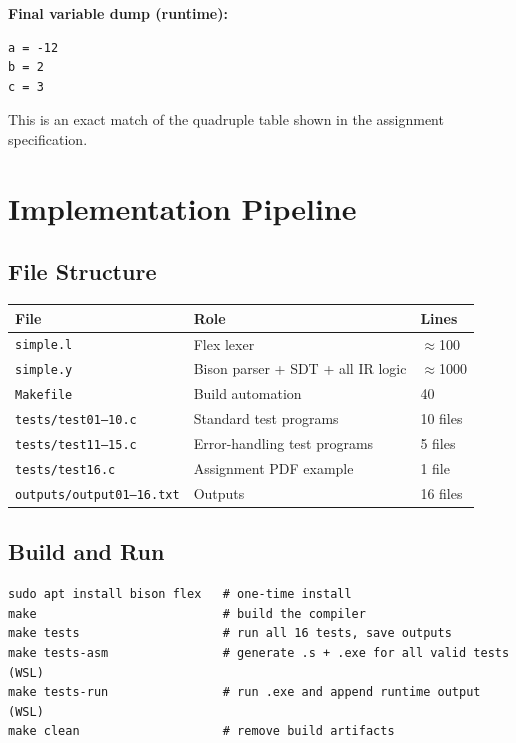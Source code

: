 \documentclass[11pt]{article}
\begin{document}
\textbf{Final variable dump (runtime):}
\begin{lstlisting}[style=outputstyle]
a = -12
b = 2
c = 3
\end{lstlisting}

This is an exact match of the quadruple table shown in the assignment specification.

\section{Implementation Pipeline}

\subsection{File Structure}

\begin{center}
\renewcommand{\arraystretch}{1.3}
\begin{tabular}{@{}lll@{}}
\toprule
\textbf{File} & \textbf{Role} & \textbf{Lines} \\
\midrule
\texttt{simple.l} & Flex lexer & $\approx$100 \\
\texttt{simple.y} & Bison parser + SDT + all IR logic & $\approx$1000 \\
\texttt{Makefile} & Build automation & 40 \\
\texttt{tests/test01--10.c} & Standard test programs & 10 files \\
\texttt{tests/test11--15.c} & Error-handling test programs & 5 files \\
\texttt{tests/test16.c} & Assignment PDF example & 1 file \\
\texttt{outputs/output01--16.txt} & Outputs & 16 files \\
\bottomrule
\end{tabular}
\end{center}

\subsection{Build and Run}

\begin{lstlisting}[style=outputstyle]
sudo apt install bison flex   # one-time install
make                          # build the compiler
make tests                    # run all 16 tests, save outputs
make tests-asm                # generate .s + .exe for all valid tests (WSL)
make tests-run                # run .exe and append runtime output (WSL)
make clean                    # remove build artifacts
\end{lstlisting}
\end{document}

